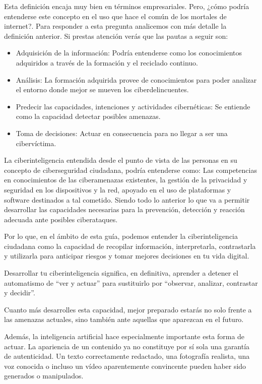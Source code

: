 \documentclass[
  spanish,
  a4paper,
  openany]{book}
\begin{document}
Esta definición encaja muy bien en términos empresariales. Pero, ¿cómo podría entenderse este concepto en el uso que hace el común de los mortales de internet?. Para responder a esta pregunta analicemos con más detalle la definición anterior. Si prestas atención verás que las pautas a seguir son:

\begin{itemize}
\item
  Adquisición de la información: Podría entenderse como los conocimientos adquiridos a través de la formación y el reciclado continuo.
\item
  Análisis: La formación adquirida provee de conocimientos para poder analizar el entorno donde mejor se mueven los ciberdelincuentes.
\item
  Predecir las capacidades, intenciones y actividades cibernéticas: Se entiende como la capacidad detectar posibles amenazas.
\item
  Toma de decisiones: Actuar en consecuencia para no llegar a ser una cibervíctima.
\end{itemize}

La ciberinteligencia entendida desde el punto de vista de las personas en su concepto de ciberseguridad ciudadana, podría entenderse como: Las competencias en conocimientos de las ciberamenazas existentes, la gestión de la privacidad y seguridad en los dispositivos y la red, apoyado en el uso de plataformas y software destinados a tal cometido. Siendo todo lo anterior lo que va a permitir desarrollar las capacidades necesarias para la prevención, detección y reacción adecuada ante posibles ciberataques.

Por lo que, en el ámbito de esta guía, podemos entender la ciberinteligencia ciudadana como la capacidad de recopilar información, interpretarla, contrastarla y utilizarla para anticipar riesgos y tomar mejores decisiones en tu vida digital.

Desarrollar tu ciberinteligencia significa, en definitiva, aprender a detener el automatismo de ``ver y actuar'' para sustituirlo por ``observar, analizar, contrastar y decidir''.

Cuanto más desarrolles esta capacidad, mejor preparado estarás no solo frente a las amenazas actuales, sino también ante aquellas que aparezcan en el futuro.

Además, la inteligencia artificial hace especialmente importante esta forma de actuar. La apariencia de un contenido ya no constituye por sí sola una garantía de autenticidad. Un texto correctamente redactado, una fotografía realista, una voz conocida o incluso un vídeo aparentemente convincente pueden haber sido generados o manipulados.
\end{document}
